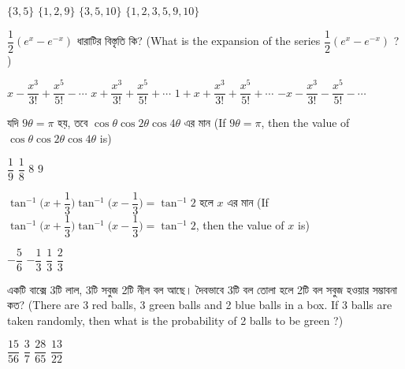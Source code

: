 \documentclass[addpoints]{exam}
\begin{document}
\begin{questions}
\begin{oneparchoices}
\choice $ \{3,5\} $
\choice $ \{1,2,9\} $
\choice $ \{3,5, 10\} $
\choice  $ \{1,2,3,5,9,10\} $

\end{oneparchoices}

\question  $ \dfrac{1}{2}(e^{x}-e^{-x}) $   ধারাটির বিস্তৃতি কি? (What is the expansion of the series  $ \dfrac{1}{2}(e^{x}-e^{-x}) $ ? )

\begin{oneparchoices}
\choice $ x-\dfrac{x^{3}}{3!} +\dfrac{x^{5}}{5!}-\cdots$
\choice $ x+\dfrac{x^{3}}{3!} +\dfrac{x^{5}}{5!}+\cdots$
\choice $ 1+x+\dfrac{x^{3}}{3!} +\dfrac{x^{5}}{5!}+\cdots$
\choice  $ -x-\dfrac{x^{3}}{3!} -\dfrac{x^{5}}{5!}-\cdots$

\end{oneparchoices}

\question   যদি $ 9\theta = \pi $ হয়, তবে $ \cos\theta\cos 2\theta \cos 4\theta $ এর মান (If $ 9\theta = \pi $, then the value of $ \cos\theta\cos 2\theta \cos 4\theta $ is)

\begin{oneparchoices}
\choice $ \dfrac{1}{9} $
\choice $ \dfrac{1}{8} $
\choice $ 8 $
\choice  $ 9 $

\end{oneparchoices}

\question  $ \tan^{-1}\Bigg(x+\dfrac{1}{3}\Bigg) \tan^{-1}\Bigg(x-\dfrac{1}{3}\Bigg) =\tan^{-1}2 $  হলে $ x $ এর মান (If $ \tan^{-1}\Bigg(x+\dfrac{1}{3}\Bigg) \tan^{-1}\Bigg(x-\dfrac{1}{3}\Bigg) =\tan^{-1}2 $, then the value of $ x $ is)

\begin{oneparchoices}
\choice $ -\dfrac{5}{6} $
\choice $ -\dfrac{1}{3} $
\choice $ \dfrac{1}{3} $
\choice  $ \dfrac{2}{3} $

\end{oneparchoices}

\question   একটি বাক্সে 3টি লাল, 3টি সবুজ 2টি নীল বল আছে। দৈবভাবে 3টি বল তোলা হলে 2টি বল সবুজ হওয়ার সম্ভাবনা কত? (There are 3 red balls, 3 green balls and 2 blue balls in a box. If 3 balls are taken randomly, then what is the probability of 2 balls to be green ?)

\begin{oneparchoices}
\choice $ \dfrac{15}{56} $
\choice $ \dfrac{3}{7} $
\choice $ \dfrac{28}{65} $
\choice  $  \dfrac{13}{22} $

\end{oneparchoices}

         







\end{questions}
\end{document}
